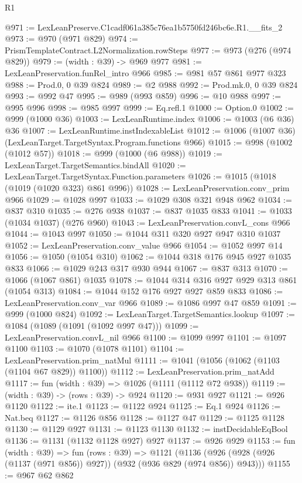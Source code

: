 \begin{lexlean}{R1}
\begin{coremodule}
@971 := LexLeanPreserve.C1cadf061a385c76ea1b5750fd246bc6e.R1.__fits_2
@973 := @970 (@971 @829)
@974 := PrismTemplateContract.L2Normalization.rowSteps
@977 := @973 (@276 (@974 @829))
@979 := (width : @39) -> @969 @977
@981 := LexLeanPreservation.funRel_intro @966
@985 := @981 @57 @861 @977 @323
@988 := Prod.{0, 0} @39 @824
@989 := @2 @988
@992 := Prod.mk.{0, 0} @39 @824
@993 := @992 @47
@995 := @989 (@993 @859)
@996 := @10 @988
@997 := @995 @996
@998 := @985 @997
@999 := Eq.refl.{1}
@1000 := Option.{0}
@1002 := @999 (@1000 @36)
@1003 := LexLeanRuntime.index
@1006 := @1003 (@6 @36) @36
@1007 := LexLeanRuntime.instIndexableList
@1012 := @1006 (@1007 @36) (LexLeanTarget.TargetSyntax.Program.functions @966)
@1015 := @998 (@1002 (@1012 @57))
@1018 := @999 (@1000 (@6 @988))
@1019 := LexLeanTarget.TargetSemantics.bindAll
@1020 := LexLeanTarget.TargetSyntax.Function.parameters
@1026 := @1015 (@1018 (@1019 (@1020 @323) @861 @996))
@1028 := LexLeanPreservation.conv_prim @966
@1029 := @1028 @997
@1033 := @1029 @308 @321 @948 @962
@1034 := @837 @310
@1035 := @276 @938
@1037 := @837 @1035 @833
@1041 := @1033 (@1034 @1037) (@276 @960)
@1043 := LexLeanPreservation.convL_cons @966
@1044 := @1043 @997
@1050 := @1044 @311 @320 @927 @947 @310 @1037
@1052 := LexLeanPreservation.conv_value @966
@1054 := @1052 @997 @14
@1056 := @1050 (@1054 @310)
@1062 := @1044 @318 @176 @945 @927 @1035 @833
@1066 := @1029 @243 @317 @930 @944
@1067 := @837 @313
@1070 := @1066 (@1067 @861) @1035
@1078 := @1044 @314 @316 @927 @929 @313 @861 (@1054 @313)
@1084 := @1044 @152 @176 @927 @927 @859 @833
@1086 := LexLeanPreservation.conv_var @966
@1089 := @1086 @997 @47 @859
@1091 := @999 (@1000 @824)
@1092 := LexLeanTarget.TargetSemantics.lookup
@1097 := @1084 (@1089 (@1091 (@1092 @997 @47)))
@1099 := LexLeanPreservation.convL_nil @966
@1100 := @1099 @997
@1101 := @1097 @1100
@1103 := @1070 (@1078 @1101)
@1104 := LexLeanPreservation.prim_natMul
@1111 := @1041 (@1056 (@1062 (@1103 (@1104 @67 @829)) @1100))
@1112 := LexLeanPreservation.prim_natAdd
@1117 := fun (width : @39) => @1026 (@1111 (@1112 @72 @938))
@1119 := (width : @39) -> (rows : @39) -> @924
@1120 := @931 @927
@1121 := @926 @1120
@1122 := ite.{1}
@1123 := @1122 @924
@1125 := Eq.{1} @924
@1126 := Nat.beq
@1127 := @1126 @856
@1128 := @1127 @47
@1129 := @1125 @1128
@1130 := @1129 @927
@1131 := @1123 @1130
@1132 := instDecidableEqBool
@1136 := @1131 (@1132 @1128 @927) @927
@1137 := @926 @929
@1153 := fun (width : @39) =>
  fun (rows : @39) =>
  @1121 (@1136 (@926 (@928 (@926 (@1137 (@971 @856)) @927)) (@932 (@936 @829 (@974 @856)) @943)))
@1155 := @967 @62 @862

\end{coremodule}
\end{lexlean}
